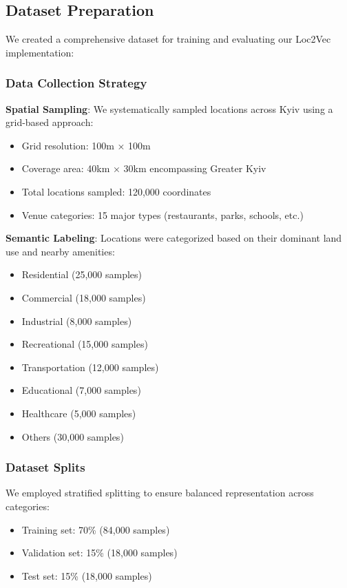 \subsection{Dataset Preparation}

We created a comprehensive dataset for training and evaluating our Loc2Vec implementation:

\subsubsection{Data Collection Strategy}

\textbf{Spatial Sampling}: We systematically sampled locations across Kyiv using a grid-based approach:
\begin{itemize}
    \item Grid resolution: 100m × 100m
    \item Coverage area: 40km × 30km encompassing Greater Kyiv
    \item Total locations sampled: 120,000 coordinates
    \item Venue categories: 15 major types (restaurants, parks, schools, etc.)
\end{itemize}

\textbf{Semantic Labeling}: Locations were categorized based on their dominant land use and nearby amenities:
\begin{itemize}
    \item Residential (25,000 samples)
    \item Commercial (18,000 samples)
    \item Industrial (8,000 samples)
    \item Recreational (15,000 samples)
    \item Transportation (12,000 samples)
    \item Educational (7,000 samples)
    \item Healthcare (5,000 samples)
    \item Others (30,000 samples)
\end{itemize}

\subsubsection{Dataset Splits}

We employed stratified splitting to ensure balanced representation across categories:
\begin{itemize}
    \item Training set: 70\% (84,000 samples)
    \item Validation set: 15\% (18,000 samples)
    \item Test set: 15\% (18,000 samples)
\end{itemize}

